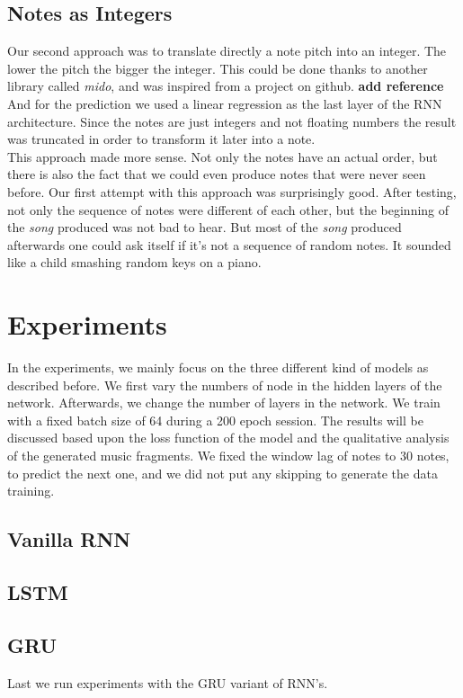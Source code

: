 \documentclass[11pt]
{article}
\begin{document}
\subsection{Notes as Integers}
Our second approach was to translate directly a note pitch into an integer. 
The lower the pitch the bigger the integer.
This could be done thanks to another library called \textit{mido}, and was inspired from a project on github. \textbf{ add reference}\\
And for the prediction we used a linear regression as the last layer of the RNN architecture. 
Since the notes are just integers and not floating numbers the result was truncated in order to transform it later into a note.\\
This approach made more sense.
Not only the notes have an actual order, but there is also the fact that we could even produce notes that were never seen before.
Our first attempt with this approach was surprisingly good.
After testing, not only the sequence of notes were different of each other, but the beginning of the \textit{song} produced was not bad to hear.
But most of the \textit{song} produced afterwards one could ask itself if it's not a sequence of random notes.
It sounded like a child smashing random keys on a piano.


\section{Experiments}
In the experiments, we mainly focus on the three different kind of models as described before. We first vary the numbers of node in the hidden layers of the network. Afterwards, we change the number of layers in the network. We train with a fixed batch size of 64 during a 200 epoch session. The results will be discussed based upon the loss function of the model and the qualitative analysis of the generated music fragments. We fixed the window lag of notes to 30 notes, to predict the next one, and we did not put any skipping to generate the data training.


\subsection{Vanilla RNN}
\subsection{LSTM}
\subsection{GRU}
Last we run experiments with the GRU variant of RNN's. 
\end{document}
